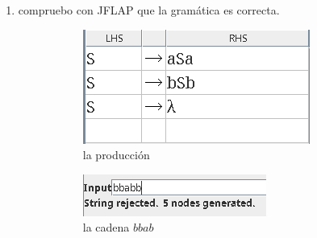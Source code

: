 \documentclass{article}
\begin{document}
\begin{flushleft}
\begin{enumerate}
                \item compruebo con JFLAP que la gramática es correcta.
                 \begin{figure}[h] 
                    \centering
                    \begin{subfigure}[b]{0.45\textwidth}
                        \centering
                        \includegraphics[width=\textwidth]{./Imagenes/produccion5.png}
                        \caption{la producción}
                        \label{fig:label18}
                    \end{subfigure}
                    \hfill
                    \begin{subfigure}[b]{0.45\textwidth}
                        \centering
                        \includegraphics[width=\textwidth]{./Imagenes/grafo8.png}
                        \caption{la cadena $bbab$}
                        \label{fig:label19}
                    \end{subfigure}
                    \vspace{0.5cm} 
                    \\
                    \begin{subfigure}[b]{0.45\textwidth}
                        \centering

\end{subfigure}
\end{figure}
\end{enumerate}
\end{flushleft}
\end{document}
